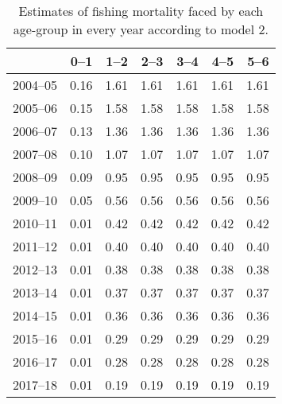 \begin{table}[ht]
\centering
\begin{tabular}{rrrrrrr}
  \hline
 & 0--1 & 1--2 & 2--3 & 3--4 & 4--5 & 5--6 \\ 
  \hline
2004--05 & 0.16 & 1.61 & 1.61 & 1.61 & 1.61 & 1.61 \\ 
  2005--06 & 0.15 & 1.58 & 1.58 & 1.58 & 1.58 & 1.58 \\ 
  2006--07 & 0.13 & 1.36 & 1.36 & 1.36 & 1.36 & 1.36 \\ 
  2007--08 & 0.10 & 1.07 & 1.07 & 1.07 & 1.07 & 1.07 \\ 
  2008--09 & 0.09 & 0.95 & 0.95 & 0.95 & 0.95 & 0.95 \\ 
  2009--10 & 0.05 & 0.56 & 0.56 & 0.56 & 0.56 & 0.56 \\ 
  2010--11 & 0.01 & 0.42 & 0.42 & 0.42 & 0.42 & 0.42 \\ 
  2011--12 & 0.01 & 0.40 & 0.40 & 0.40 & 0.40 & 0.40 \\ 
  2012--13 & 0.01 & 0.38 & 0.38 & 0.38 & 0.38 & 0.38 \\ 
  2013--14 & 0.01 & 0.37 & 0.37 & 0.37 & 0.37 & 0.37 \\ 
  2014--15 & 0.01 & 0.36 & 0.36 & 0.36 & 0.36 & 0.36 \\ 
  2015--16 & 0.01 & 0.29 & 0.29 & 0.29 & 0.29 & 0.29 \\ 
  2016--17 & 0.01 & 0.28 & 0.28 & 0.28 & 0.28 & 0.28 \\ 
  2017--18 & 0.01 & 0.19 & 0.19 & 0.19 & 0.19 & 0.19 \\ 
   \hline
\end{tabular}
\caption{Estimates of fishing mortality faced by each age-group in every year according to model 2.} 
\label{tab:Mod2-FishingMortality}
\end{table}
